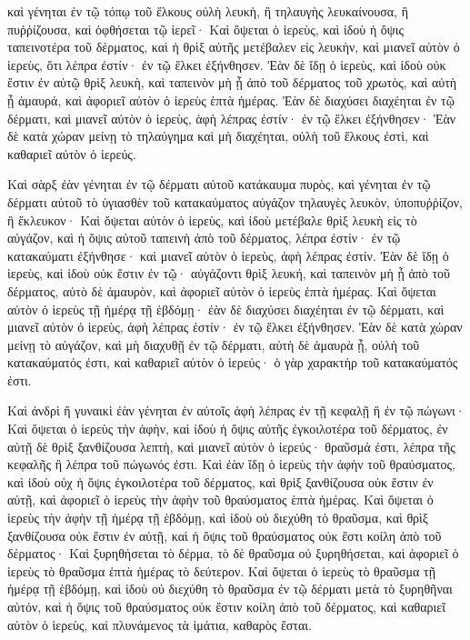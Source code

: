 {καὶ γένηται ἐν τῷ τόπῳ τοῦ ἕλκους οὐλὴ λευκὴ, ἢ τηλαυγὴς λευκαίνουσα, ἢ πυῤῥίζουσα, καὶ ὀφθήσεται τῷ ἱερεῖ·
Καὶ ὄψεται ὁ ἱερεὺς, καὶ ἰδοὺ ἡ ὄψις ταπεινοτέρα τοῦ δέρματος, καὶ ἡ θρὶξ αὐτῆς μετέβαλεν εἰς λευκὴν, καὶ μιανεῖ αὐτὸν ὁ ἱερεὺς, ὅτι λέπρα ἐστίν· ἐν τῷ ἕλκει ἐξήνθησεν.
Ἐὰν δὲ ἴδῃ ὁ ἱερεὺς, καὶ ἰδοὺ οὐκ ἔστιν ἐν αὐτῷ θρὶξ λευκὴ, καὶ ταπεινὸν μὴ ᾖ ἀπὸ τοῦ δέρματος τοῦ χρωτὸς, καὶ αὐτὴ ᾖ ἀμαυρά, καὶ ἀφοριεῖ αὐτὸν ὁ ἱερεὺς ἑπτὰ ἡμέρας.
Ἐὰν δὲ διαχύσει διαχέηται ἐν τῷ δέρματι, καὶ μιανεῖ αὐτὸν ὁ ἱερεὺς, ἁφὴ λέπρας ἐστίν· ἐν τῷ ἕλκει ἐξήνθησεν·
Ἐὰν δὲ κατὰ χώραν μείνῃ τὸ τηλαύγημα καὶ μὴ διαχέηται, οὐλὴ τοῦ ἕλκους ἐστὶ, καὶ καθαριεῖ αὐτὸν ὁ ἱερεύς.
\par }{\PP {}Καὶ σὰρξ ἐὰν γένηται ἐν τῷ δέρματι αὐτοῦ κατάκαυμα πυρὸς, καὶ γένηται ἐν τῷ δέρματι αὐτοῦ τὸ ὑγιασθὲν τοῦ κατακαύματος αὐγάζον τηλαυγὲς λευκὸν, ὑποπυῤῥίζον, ἢ ἔκλευκον·
Καὶ ὄψεται αὐτὸν ὁ ἱερεὺς, καὶ ἰδοὺ μετέβαλε θρὶξ λευκὴ εἰς τὸ αὐγάζον, καὶ ἡ ὄψις αὐτοῦ ταπεινὴ ἀπὸ τοῦ δέρματος, λέπρα ἐστίν· ἐν τῷ κατακαύματι ἐξήνθησε· καὶ μιανεῖ αὐτὸν ὁ ἱερεὺς, ἁφὴ λέπρας ἐστίν.
Ἐὰν δὲ ἴδῃ ὁ ἱερεὺς, καὶ ἰδοὺ οὐκ ἔστιν ἐν τῷ· αὐγάζοντι θρὶξ λευκή, καὶ ταπεινὸν μὴ ᾖ ἀπὸ τοῦ δέρματος, αὐτὸ δὲ ἀμαυρὸν, καὶ ἀφοριεῖ αὐτὸν ὁ ἱερεὺς ἑπτὰ ἡμέρας.
Καὶ ὄψεται αὐτὸν ὁ ἱερεὺς τῇ ἡμέρᾳ τῇ ἑβδόμῃ· ἐὰν δὲ διαχύσει διαχέηται ἐν τῷ δέρματι, καὶ μιανεῖ αὐτὸν ὁ ἱερεὺς, ἁφὴ λέπρας ἐστίν· ἐν τῷ ἕλκει ἐξήνθησεν.
Ἐὰν δὲ κατὰ χώραν μείνῃ τὸ αὐγάζον, καὶ μὴ διαχυθῇ ἐν τῷ δέρματι, αὐτὴ δὲ ἀμαυρὰ ᾖ, οὐλὴ τοῦ κατακαύματός ἐστι, καὶ καθαριεῖ αὐτὸν ὁ ἱερεύς· ὁ γὰρ χαρακτὴρ τοῦ κατακαύματός ἐστι.
\par }{\PP {}Καὶ ἀνδρὶ ἢ γυναικὶ ἐὰν γένηται ἐν αὐτοῖς ἁφὴ λέπρας ἐν τῇ κεφαλῇ ἢ ἐν τῷ πώγωνι·
Καὶ ὄψεται ὁ ἱερεὺς τὴν ἁφὴν, καὶ ἰδοὺ ἡ ὄψις αὐτῆς ἐγκοιλοτέρα τοῦ δέρματος, ἐν αὐτῇ δὲ θρὶξ ξανθίζουσα λεπτὴ, καὶ μιανεῖ αὐτὸν ὁ ἱερεύς· θραῦσμά ἐστι, λέπρα τῆς κεφαλῆς ἢ λέπρα τοῦ πώγωνός ἐστι.
Καὶ ἐὰν ἴδῃ ὁ ἱερεὺς τὴν ἁφὴν τοῦ θραύσματος, καὶ ἰδοὺ οὐχ ἡ ὄψις ἐγκοιλοτέρα τοῦ δέρματος, καὶ θρὶξ ξανθίζουσα οὐκ ἔστιν ἐν αὐτῇ, καὶ ἀφοριεῖ ὁ ἱερεὺς τὴν ἁφὴν τοῦ θραύσματος ἑπτὰ ἡμέρας.
Καὶ ὄψεται ὁ ἱερεὺς τὴν ἁφὴν τῇ ἡμέρᾳ τῇ ἑβδόμῃ, καὶ ἰδοὺ οὐ διεχύθη τὸ θραῦσμα, καὶ θρὶξ ξανθίζουσα οὐκ ἔστιν ἐν αὐτῇ, καὶ ἡ ὄψις τοῦ θραύσματος οὐκ ἔστι κοίλη ἀπὸ τοῦ δέρματος·
Καὶ ξυρηθήσεται τὸ δέρμα, τὸ δὲ θραῦσμα οὐ ξυρηθήσεται, καὶ ἀφοριεῖ ὁ ἱερεὺς τὸ θραῦσμα ἑπτὰ ἡμέρας τὸ δεύτερον.
Καὶ ὄψεται ὁ ἱερεὺς τὸ θραῦσμα τῇ ἡμέρᾳ τῇ ἑβδόμῃ, καὶ ἰδοὺ οὐ διεχύθη τὸ θραῦσμα ἐν τῷ δέρματι μετὰ τὸ ξυρηθῆναι αὐτόν, καὶ ἡ ὄψις τοῦ θραύσματος οὐκ ἔστιν κοίλη ἀπὸ τοῦ δέρματος, καὶ καθαριεῖ αὐτὸν ὁ ἱερεὺς, καὶ πλυνάμενος τὰ ἱμάτια, καθαρὸς ἔσται.
}
